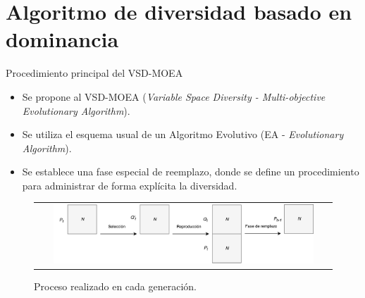 \documentclass{beamer}
\begin{document}
\section{Algoritmo de diversidad basado en dominancia}

\begin{frame}{Procedimiento principal del VSD-MOEA}
\begin{itemize}
\justifying
\item Se propone al VSD-MOEA (\textit{Variable Space Diversity - Multi-objective Evolutionary Algorithm}).
\justifying
\item Se utiliza el esquema usual de un Algoritmo Evolutivo (EA - \textit{Evolutionary Algorithm}).
\justifying
\item Se establece una fase especial de reemplazo, donde se define un procedimiento para administrar de forma explícita la diversidad.
\end{itemize}
\begin{figure}
\centering
\begin{tabular}{c}
\includegraphics[width=0.9\textwidth]{Evolution_Process.pdf}
\end{tabular}
\caption{Proceso realizado en cada generación.}
\label{fig:DiversityProposal}
\end{figure}
\end{frame}
\end{document}
